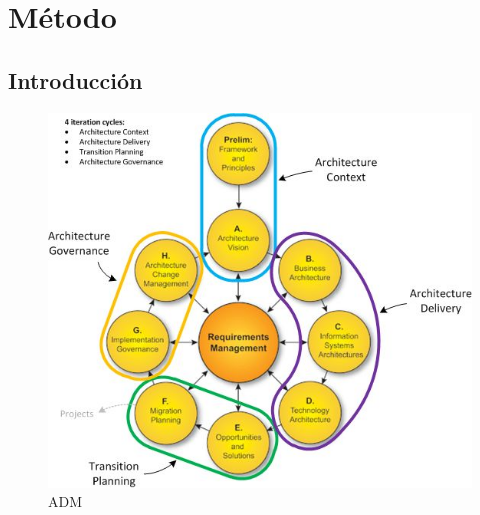 \chapter{Método}
\section{Introducción}
\newpage
\begin{figure}[h!]
	\centering
	\includegraphics[width=0.7\linewidth]{arquitectura/imgs/ADM}
	\caption[ADM]{ADM}
	\label{fig:adm}
\end{figure}
\cite{IDL1,id1,id2,id3,id4,id5,id6}